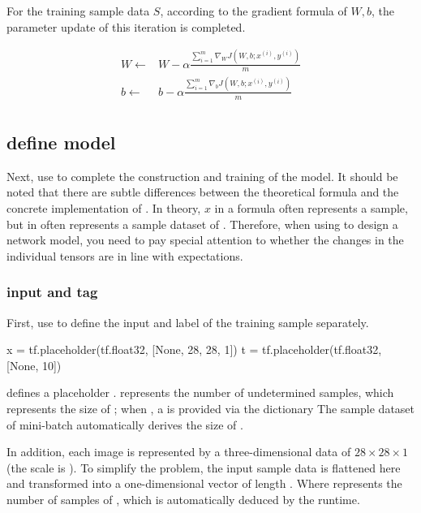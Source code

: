 \begin{content}
For the training sample data $S$, according to the gradient formula of $W, b$, the parameter update of this iteration is completed.

\[\begin{aligned}
  W \leftarrow & W - \alpha \frac{{\sum\limits_{i = 1}^m {{\nabla _W}J\left( {W,b;{x^{(i)}},{y ^{(i)}}} \right)} }}{m} \\ 
  b \leftarrow & b - \alpha \frac{{\sum\limits_{i = 1}^m {{\nabla _b}J\left( {W,b;{x^{(i)}},{y ^{(i)}}} \right)} }}{m} \\ 
\end{aligned} \]

\subsection{define model}

Next, use \tf{} to complete the construction and training of the model. It should be noted that there are subtle differences between the theoretical formula and the concrete implementation of \tf{}. In theory, $x$ in a formula often represents a sample, but  in \tf{} often represents a sample dataset of . Therefore, when using \tf{} to design a network model, you need to pay special attention to whether the changes in the individual tensors are in line with expectations.

\subsubsection{input and tag}

First, use  to define the input and label of the training sample separately.

\begin{leftbar}
\begin{python}
x = tf.placeholder(tf.float32, [None, 28, 28, 1])
t = tf.placeholder(tf.float32, [None, 10])
\end{python}
\end{leftbar}

 defines a placeholder .  represents the number of undetermined samples, which represents the size of ; when , a \ascii is provided via the  dictionary The sample dataset of {mini-batch} automatically derives the size of .

In addition, each image is represented by a three-dimensional data of $ 28 \times 28 \times 1 $ (the scale is ). To simplify the problem, the input sample data is flattened here and transformed into a one-dimensional vector of length . Where  represents the number of samples of , which is automatically deduced by the runtime.


\end{content}
